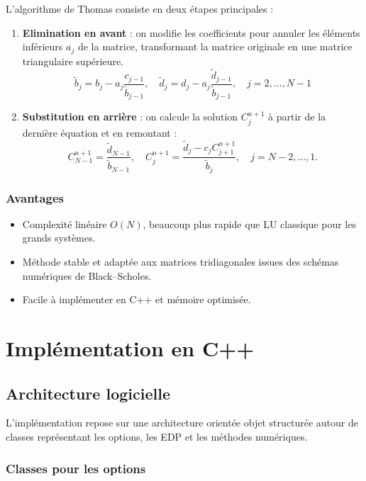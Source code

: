 \documentclass[12pt,a4paper]{article}
\begin{document}
L’algorithme de Thomas consiste en deux étapes principales :

\begin{enumerate}
\item \textbf{Elimination en avant} : on modifie les coefficients pour annuler les
éléments inférieurs $a_j$ de la matrice, transformant la matrice originale en une
matrice triangulaire supérieure.
\[
\tilde{b}_j = b_j - a_j \frac{c_{j-1}}{\tilde{b}_{j-1}}, \quad
\tilde{d}_j = d_j - a_j \frac{\tilde{d}_{j-1}}{\tilde{b}_{j-1}}, \quad j = 2,\dots,N-1
\]

\item \textbf{Substitution en arrière} : on calcule la solution $C_{j}^{n+1}$ à
partir de la dernière équation et en remontant :
\[
C_{N-1}^{n+1} = \frac{\tilde{d}_{N-1}}{\tilde{b}_{N-1}}, \quad
C_j^{n+1} = \frac{\tilde{d}_j - c_j C_{j+1}^{n+1}}{\tilde{b}_j}, \quad j = N-2,\dots,1.
\]
\end{enumerate}

\subsubsection*{Avantages}

\begin{itemize}
\item Complexité linéaire $O(N)$, beaucoup plus rapide que LU classique pour les
grands systèmes.
\item Méthode stable et adaptée aux matrices tridiagonales issues des schémas
numériques de Black--Scholes.
\item Facile à implémenter en C++ et mémoire optimisée.
\end{itemize}


\section{Implémentation en C++}

\subsection{Architecture logicielle}

L’implémentation repose sur une architecture orientée objet structurée autour de classes représentant les options, les EDP et les méthodes numériques.

\subsubsection{Classes pour les options}
\end{document}
